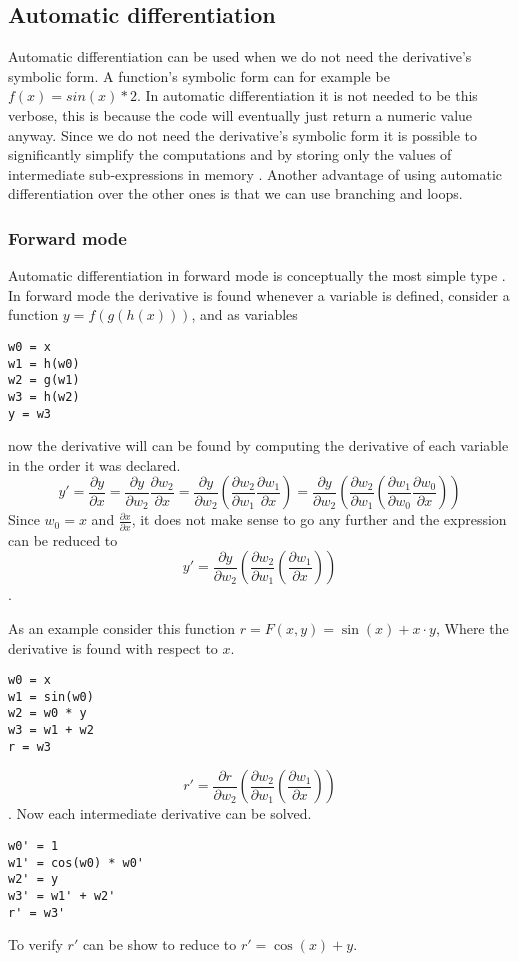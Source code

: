 \subsection{Automatic differentiation}%
\label{sub:autodiff}

Automatic differentiation can be used when we do not need the derivative's symbolic form.
A function's symbolic form can for example be $f(x) = sin(x) * 2$.
In automatic differentiation it is not needed to be this verbose, this is because the code will eventually just return a numeric value anyway.
Since we do not need the derivative's symbolic form it is possible to significantly simplify the computations and by storing only the values of intermediate sub-expressions in memory \cite{autodiff}. Another advantage of using automatic differentiation over the other ones is that we can use branching and loops.

\subsubsection{Forward mode}

Automatic differentiation in forward mode is conceptually the most simple type \cite{autodiff}. In forward mode the derivative is found whenever a variable is defined, consider a function
$y = f(g(h(x)))$, and as variables
\begin{lstlisting}
w0 = x
w1 = h(w0)
w2 = g(w1)
w3 = h(w2)
y = w3
\end{lstlisting}
now the derivative will can be found by computing the derivative of each variable in the order it was declared.
$$y' = \frac{\partial y}{\partial x} = \frac{\partial y}{\partial w_2} \frac{\partial w_2}{\partial x} = \frac{\partial y}{\partial w_2} \left(\frac{\partial w_2}{\partial w_1} \frac{\partial w_1}{\partial x}\right) = \frac{\partial y}{\partial w_2} \left(\frac{\partial w_2}{\partial w_1} \left(\frac{\partial w_1}{\partial w_0} \frac{\partial w_0}{\partial x}\right) \right)$$
Since $w_0 = x$ and $\frac{\partial x}{\partial x}$, it does not make sense to go any further and the expression can be reduced to
$$y' = \frac{\partial y}{\partial w_2} \left(\frac{\partial w_2}{\partial w_1} \left(\frac{\partial w_1}{\partial x}\right) \right)$$.

As an example consider this function $r = F(x, y) = \sin(x) + x\cdot y$, Where the derivative is found with respect to $x$.
\begin{lstlisting}[label={lst:autodiff_fwd_trace}, caption={Forward trace of a simple function $f(x, y) = \sin(x) + x\cdot y$}]
w0 = x
w1 = sin(w0)
w2 = w0 * y
w3 = w1 + w2
r = w3
\end{lstlisting}
$$r' = \frac{\partial r}{\partial w_2} \left(\frac{\partial w_2}{\partial w_1} \left(\frac{\partial w_1}{\partial x}\right) \right)$$.
Now each intermediate derivative can be solved.
\begin{lstlisting}[label={lst:autodiff_fwd_deriv}, caption={Forward derivative trace of a simple function $f(x, y) = \sin(x) + x\cdot y$}]
w0' = 1
w1' = cos(w0) * w0'
w2' = y
w3' = w1' + w2'
r' = w3'
\end{lstlisting}
To verify $r'$ can be show to reduce to $r' = \cos(x) + y$.

